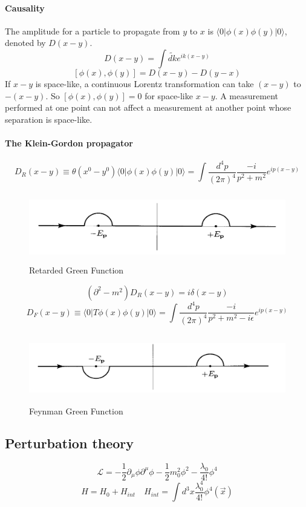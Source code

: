 \documentclass{article}
\begin{document}
\paragraph{Causality}
The amplitude for a particle to propagate from $y$ to $x$ is $\langle 0 | \phi(x) \phi(y) | 0 \rangle$, denoted by $D(x-y)$.
\[D(x-y) = \int \widetilde{dk} e^{ik(x-y)}\]
\[[\phi(x),\phi(y)] = D(x-y) -D(y-x)\]
If $x-y$ is space-like, a continuous Lorentz transformation can take $(x-y)$ to $-(x-y)$. So $[\phi(x),\phi(y)] =0$ for space-like $x-y$. A measurement performed at one point can not affect a measurement at another point whose separation is space-like.
\paragraph{The Klein-Gordon propagator}
\[D_R(x-y) \equiv \theta(x^0-y^0) \langle 0 | \phi(x) \phi(y) | 0 \rangle = \int \frac{d^4 p}{(2\pi)^4} \frac{-i}{p^2+m^2} e^{ip(x-y)}\]
\begin{figure}[!h]
\centering
\includegraphics[height=3cm ,width=14cm]{./pic/R_Green.png}
\caption{Retarded Green Function}
\end{figure}
\[(\partial^2-m^2) D_R(x-y) = i \delta(x-y)\]
\[D_F(x-y) \equiv \langle 0 | T\phi(x) \phi(y) | 0 \rangle = \int \frac{d^4 p}{(2\pi)^4} \frac{-i}{p^2+m^2-i\epsilon} e^{ip(x-y)}\]
\begin{figure}[!h]
\centering
\includegraphics[height=3cm ,width=14cm]{./pic/F_Green.png}
\caption{Feynman Green Function}
\end{figure}

\subsection{Perturbation theory}
\[\mathcal{L} = -\frac{1}{2}\partial_{\mu} \phi \partial^{\mu} \phi -\frac{1}{2}m_0^2 \phi^2 -\frac{\lambda_0}{4!}\phi^4\]
\[H = H_0 + H_{int} \quad H_{int} = \int d^3 x \frac{\lambda_0^4}{4!} \phi^4 (\vec{x})\]
\end{document}
